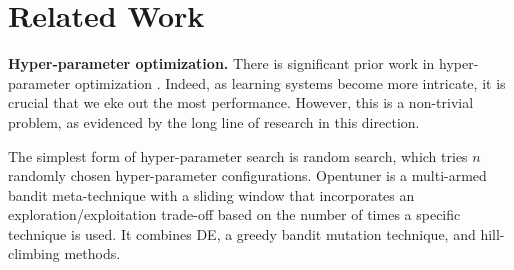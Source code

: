 \section{Related Work}
\label{sec:app:lit}

\textbf{Hyper-parameter optimization.} There is significant prior work in hyper-parameter optimization \cite{agrawal2019dodge, cowen2022hebo, li2017hyperband, bergstra2011algorithms, bergstra2012random, falkner2018bohb, eriksson2019scalable, ansel:pact:2014}. Indeed, as learning systems become more intricate, it is crucial that we eke out the most performance. However, this is a non-trivial problem, as evidenced by the long line of research in this direction. 

The simplest form of hyper-parameter search is random search, which tries $n$ randomly chosen hyper-parameter configurations. Opentuner \cite{ansel2014opentuner} is a multi-armed bandit meta-technique with a sliding window that incorporates an exploration/exploitation trade-off based on the number of times a specific technique is used. It combines DE, a greedy bandit mutation technique, and hill-climbing methods. 

